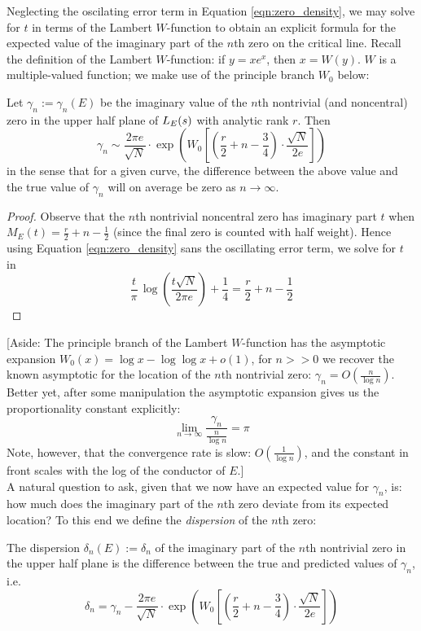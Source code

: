 Neglecting the oscilating error term in Equation \ref{eqn:zero_density}, we may solve for $t$ in terms of the Lambert $W$-function to obtain an explicit formula for the expected value of the imaginary part of the $n$th zero on the critical line. Recall the definition of the Lambert $W$-function: if $y = x e^x$, then $x = W(y)$. $W$ is a multiple-valued function; we make use of the principle branch $W_0$ below:
\begin{corollary}
Let $\gamma_n := \gamma_n(E)$ be the imaginary value of the $n$th nontrivial (and noncentral) zero in the upper half plane of $L_E(s)$ with analytic rank $r$. Then
\begin{equation}\label{approx:gamma_n}
\gamma_n \sim \frac{2\pi e}{\sqrt{N}} \cdot \exp \left(W_0\left[\left(\frac{r}{2} +n - \frac{3}{4}\right)\cdot \frac{\sqrt{N}}{2 e}\right]\right)
\end{equation}
in the sense that for a given curve, the difference between the above value and the true value of $\gamma_n$ will on average be zero as $n \to \infty$.
\end{corollary}
\begin{proof}
Observe that the $n$th nontrivial noncentral zero has imaginary part $t$ when $M_E(t) = \frac{r}{2} + n - \frac{1}{2}$ (since the final zero is counted with half weight). Hence using Equation \ref{eqn:zero_density} sans the oscillating error term, we solve for $t$ in
\begin{equation*}
\frac{t}{\pi} \, \log\left(\frac{t\sqrt{N}}{2\pi e}\right) + \frac{1}{4} = \frac{r}{2} + n - \frac{1}{2}
\end{equation*}
\end{proof}

[Aside: The principle branch of the Lambert $W$-function has the asymptotic expansion $W_0(x) = \log x - \log \log x + o\left(1\right)$, for $n >> 0$ we recover the known asymptotic for the location of the $n$th nontrivial zero: $\gamma_n = O\left(\frac{n}{\log n} \right)$. Better yet, after some manipulation the asymptotic expansion gives us the proportionality constant explicitly:
\begin{equation}
\lim_{n \to \infty} \frac{\gamma_n}{\frac{n}{\log n}} = \pi
\end{equation}
Note, however, that the convergence rate is slow: $O(\frac{1}{\log n})$, and the constant in front scales with the log of the conductor of $E$.] \\

A natural question to ask, given that we now have an expected value for $\gamma_n$, is: how much does the imaginary part of the $n$th zero deviate from its expected location? To this end we define the {\it dispersion} of the $n$th zero:
\begin{definition}
The dispersion $\delta_n(E) := \delta_n$ of the imaginary part of the $n$th nontrivial zero in the upper half plane is the difference between the true and predicted values of $\gamma_n$, i.e.
\begin{equation}
\delta_n = \gamma_n - \frac{2\pi e}{\sqrt{N}} \cdot \exp \left(W_0\left[\left(\frac{r}{2} +n - \frac{3}{4}\right)\cdot \frac{\sqrt{N}}{2 e}\right]\right)
\end{equation}
\end{definition}

